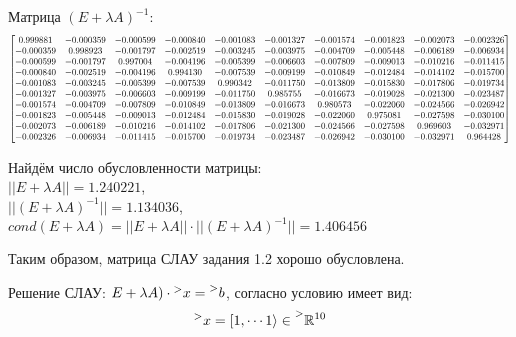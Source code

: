 \documentclass[14pt,a4paper]{scrartcl}
\newcommand\scalemath[2]{\scalebox{#1}{\mbox{\ensuremath{\displaystyle #2}}}}
\begin{document}
Матрица $(E + \lambda A)^{-1}$:
\begin{equation*}
\scalemath{0.71}
{
	\begin{bmatrix}{}
	0.999881 & -0.000359 & -0.000599 & -0.000840 & -0.001083 & -0.001327 & -0.001574 & -0.001823 & -0.002073 & -0.002326 \\ 
	-0.000359 & 0.998923 & -0.001797 & -0.002519 & -0.003245 & -0.003975 & -0.004709 & -0.005448 & -0.006189 & -0.006934 \\ 
	-0.000599 & -0.001797 & 0.997004 & -0.004196 & -0.005399 & -0.006603 & -0.007809 & -0.009013 & -0.010216 & -0.011415 \\ 
	-0.000840 & -0.002519 & -0.004196 & 0.994130 & -0.007539 & -0.009199 & -0.010849 & -0.012484 & -0.014102 & -0.015700 \\ 
	-0.001083 & -0.003245 & -0.005399 & -0.007539 & 0.990342 & -0.011750 & -0.013809 & -0.015830 & -0.017806 & -0.019734 \\ 
	-0.001327 & -0.003975 & -0.006603 & -0.009199 & -0.011750 & 0.985755 & -0.016673 & -0.019028 & -0.021300 & -0.023487 \\ 
	-0.001574 & -0.004709 & -0.007809 & -0.010849 & -0.013809 & -0.016673 & 0.980573 & -0.022060 & -0.024566 & -0.026942 \\ 
	-0.001823 & -0.005448 & -0.009013 & -0.012484 & -0.015830 & -0.019028 & -0.022060 & 0.975081 & -0.027598 & -0.030100 \\ 
	-0.002073 & -0.006189 & -0.010216 & -0.014102 & -0.017806 & -0.021300 & -0.024566 & -0.027598 & 0.969603 & -0.032971 \\ 
	-0.002326 & -0.006934 & -0.011415 & -0.015700 & -0.019734 & -0.023487 & -0.026942 & -0.030100 & -0.032971 & 0.964428 \\ 
	\end{bmatrix}
}
\end{equation*}


Найдём число обусловленности матрицы:\\
$||E + \lambda A|| = 1.240221$,\\  $||(E + \lambda A)^{-1} || = 1.134036$,\\  $cond(E + \lambda A) = ||E + \lambda A|| \cdot ||(E + \lambda A)^{-1} || = 1.406456 $

Таким образом, матрица СЛАУ задания 1.2 хорошо обусловлена.

Решение СЛАУ: $E+\lambda A) \cdot \prescript{>}{}{x} = \prescript{>}{}{b}$, согласно условию имеет вид:
\begin{equation*}
	\prescript{>}{}{x} = [1, \cdots 1\rangle \in \prescript{>}{}{\mathbb{R}^{10}}
\end{equation*}
\end{document}
